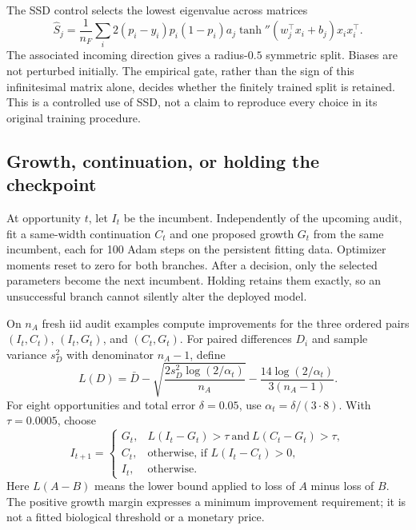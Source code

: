 \documentclass[11pt]{article}
\theoremstyle{remark}\newtheorem{remark}[theorem]{Remark}
\begin{document}
The SSD control selects the lowest eigenvalue across matrices
\begin{equation}
 \widehat S_j=\frac1{n_F}\sum_i
 2(p_i-y_i)p_i(1-p_i)a_j\tanh''(w_j^\top x_i+b_j)x_ix_i^\top.
\end{equation}
The associated incoming direction gives a radius-$0.5$ symmetric split.
Biases are not perturbed initially. The empirical gate, rather than the sign
of this infinitesimal matrix alone, decides whether the finitely trained
split is retained. This is a controlled use of SSD, not a claim to reproduce
every choice in its original training procedure.

\subsection{Growth, continuation, or holding the checkpoint}
At opportunity $t$, let $I_t$ be the incumbent. Independently of the upcoming
audit, fit a same-width continuation $C_t$ and one proposed growth $G_t$ from
the same incumbent, each for 100 Adam steps on the persistent fitting data.
Optimizer moments reset to zero for both branches. After a decision, only
the selected parameters become the next incumbent. Holding retains them
exactly, so an unsuccessful branch cannot silently alter the deployed model.

On $n_A$ fresh iid audit examples compute improvements for the three ordered
pairs $(I_t,C_t)$, $(I_t,G_t)$, and $(C_t,G_t)$. For paired differences $D_i$
and sample variance $s_D^2$ with denominator $n_A-1$, define
\begin{equation}
 L(D)=\bar D-\sqrt{\frac{2s_D^2\log(2/\alpha_t)}{n_A}}
             -\frac{14\log(2/\alpha_t)}{3(n_A-1)}.
 \label{eq:eb-gate}
\end{equation}
For eight opportunities and total error $\delta=0.05$, use
$\alpha_t=\delta/(3\cdot8)$. With $\tau=0.0005$, choose
\begin{equation}
 I_{t+1}=\begin{cases}
 G_t,&L(I_t-G_t)>\tau\ \text{and}\ L(C_t-G_t)>\tau,\\
 C_t,&\text{otherwise, if }L(I_t-C_t)>0,\\
 I_t,&\text{otherwise}.
 \end{cases}
 \label{eq:decision}
\end{equation}
Here $L(A-B)$ means the lower bound applied to loss of $A$ minus loss of $B$.
The positive growth margin expresses a minimum improvement requirement; it
is not a fitted biological threshold or a monetary price.
\end{document}
